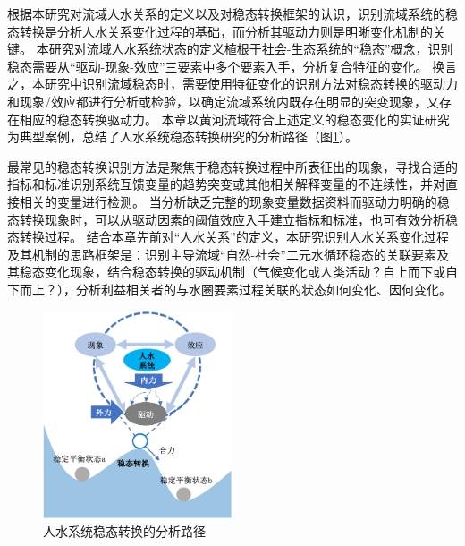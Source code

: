 根据本研究对流域人水关系的定义以及对稳态转换框架的认识，识别流域系统的稳态转换是分析人水关系变化过程的基础，而分析其驱动力则是明晰变化机制的关键。
本研究对流域人水系统状态的定义植根于社会-生态系统的“稳态”概念，识别稳态需要从“驱动-现象-效应”三要素中多个要素入手，分析复合特征的变化。
换言之，本研究中识别流域稳态时，需要使用特征变化的识别方法对稳态转换的驱动力和现象/效应都进行分析或检验，以确定流域系统内既存在明显的突变现象，又存在相应的稳态转换驱动力。
本章以黄河流域符合上述定义的稳态变化的实证研究为典型案例，总结了人水系统稳态转换研究的分析路径（图\ref{ch2:fig:identifying}）。

最常见的稳态转换识别方法是聚焦于稳态转换过程中所表征出的现象，寻找合适的指标和标准识别系统互馈变量的趋势突变或其他相关解释变量的不连续性，并对直接相关的变量进行检测。
当分析缺乏完整的现象变量数据资料而驱动力明确的稳态转换现象时，可以从驱动因素的阈值效应入手建立指标和标准，也可有效分析稳态转换过程。
结合本章先前对“人水关系”的定义，本研究识别人水关系变化过程及其机制的思路框架是：识别主导流域“自然-社会”二元水循环稳态的关联要素及其稳态变化现象，结合稳态转换的驱动机制（气候变化或人类活动？自上而下或自下而上？），分析利益相关者的与水圈要素过程关联的状态如何变化、因何变化。

\begin{figure}[!htb] %
    \centering
    \includegraphics[width=0.5\textwidth]{img/ch2/ch2_framework.png}
    \caption{人水系统稳态转换的分析路径}\label{ch2:fig:identifying}
\end{figure}
